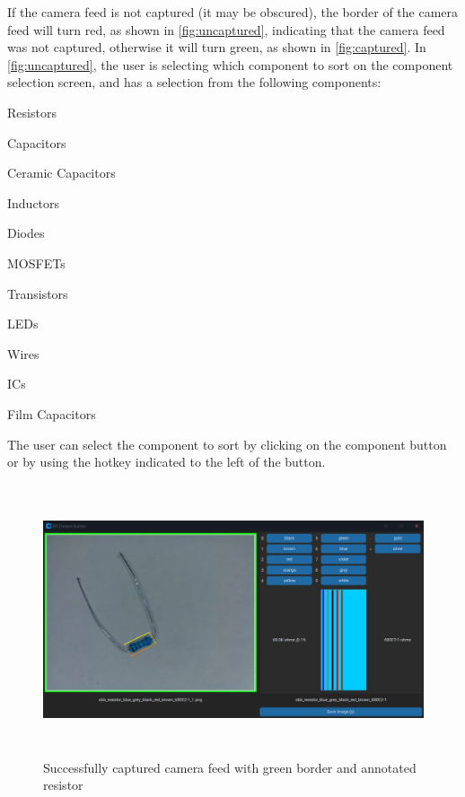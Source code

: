 If the camera feed is not captured (it may be obscured), the border of the camera feed will turn red, as shown in \autoref{fig:uncaptured}, indicating that the camera feed was not captured, otherwise it will turn green, as shown in \autoref{fig:captured}. In \autoref{fig:uncaptured}, the user is selecting which component to sort on the component selection screen, and has a selection from the following components: 
\begin{multicols}{2}
    \begin{mylist}
        \item Resistors
        \item Capacitors
        \item Ceramic Capacitors
        \item Inductors
        \item Diodes
        \item MOSFETs
        \item Transistors
        \item LEDs
        \item Wires
        \item ICs
        \item Film Capacitors
    \end{mylist}
\end{multicols}

The user can select the component to sort by clicking on the component button or by using the hotkey indicated to the left of the button.  

\begin{figure}[H]
    \hfill
    \begin{minipage}[t]{\textwidth}
      \centering
      \includegraphics[height=8cm]{imgs/python/captured.jpg}
      \caption{Successfully captured camera feed with green border and annotated resistor}
        \label{fig:captured}
    \end{minipage}
\end{figure}

